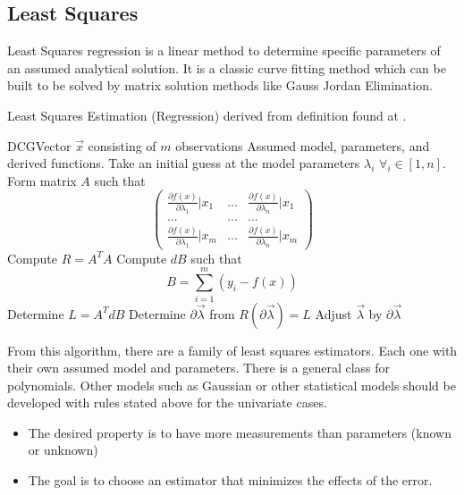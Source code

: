 \documentclass[12pt ]{article}
\begin{document}
\subsection{Least Squares}
Least Squares regression is a linear method to determine specific parameters of an assumed analytical solution.  It is a classic curve fitting method which can be built to be solved by matrix solution methods like Gauss Jordan Elimination.
\begin{algorithm}
\caption{Least Squares Estimation (Regression) derived from definition found at \cite{wolfram-mathworld-least-squares}.}
\label{alg:least-squares}
\begin{algorithmic}
\REQUIRE DCGVector $\vec{x}$ consisting of $m$ observations
\REQUIRE Assumed model, parameters, and derived functions.
\STATE Take an initial guess at the model parameters $\lambda _i$ $\forall _i \in [1, n]$.
\REPEAT
\STATE Form matrix $A$ such that 
\begin{equation}
\left(\begin{array}{ccc}
	\frac{\partial {f(x)} } {\partial{\lambda_1}} |x_1 & ... & \frac{\partial {f(x)} } {\partial{\lambda_n }} |x_1 \\
	... & ... & ... \\
	 \frac{\partial {f(x)} } {\partial{\lambda_1}} |x_m & ... &  \frac{\partial {f(x)} } {\partial{\lambda_n}} |x_m
\end{array}\right)
\end{equation}
\STATE Compute $R = A^T A$ 
\STATE Compute $dB$ such that 
\begin{equation}
B = \sum _{i= 1} ^{m} ( y_i - f(x) )
\end{equation} 
\STATE Determine $L = A^T dB$
\STATE Determine $\partial \vec{\lambda}$ from $R(\partial {\vec{\lambda}}) = L $
\STATE Adjust $\vec{\lambda}$ by $\partial \vec{\lambda}$
\end{algorithmic}
\end{algorithm} 
From this algorithm, there are a family of least squares estimators.   Each one with their own assumed model and parameters.   There is a general class for polynomials.   Other models such as Gaussian or other statistical models should be developed with rules stated above for the univariate cases. 

	\begin{itemize}
	\item The desired property is to have more measurements than parameters (known or unknown)
	\item The goal is to choose an estimator that minimizes the effects of the error.
	\end{itemize}
\end{document}
